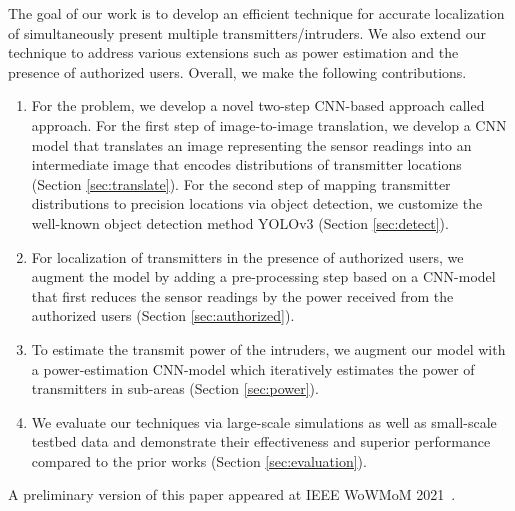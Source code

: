   The goal of our work is to develop an
efficient technique for accurate localization of simultaneously
present multiple transmitters/intruders. We also extend our technique to address various
extensions such as power estimation and the presence of authorized users. Overall, we make the following 
contributions.
\begin{enumerate}
\item
For the \mtl problem, we develop a novel two-step CNN-based approach called \our approach. 
For the first step of image-to-image translation, we develop a CNN model that translates an image representing the sensor readings into an intermediate image that encodes distributions of transmitter locations (Section \ref{sec:translate}). 
For the second step of mapping transmitter distributions to precision locations via object detection,
we customize the well-known  object detection method YOLOv3 (Section \ref{sec:detect}).

\item
For localization of transmitters in the presence of authorized users, we 
augment the \our model by adding a pre-processing step based on a 
CNN-model that first reduces the 
sensor readings by the power received from the authorized users (Section \ref{sec:authorized}).

\item
To estimate the transmit power of the intruders, we augment our \our model
with a power-estimation CNN-model which iteratively estimates the power of transmitters
in sub-areas (Section \ref{sec:power}).

\item
We evaluate our techniques via large-scale simulations as well as small-scale testbed data and demonstrate their effectiveness and superior
performance compared to the prior works (Section \ref{sec:evaluation}).
\end{enumerate}

A preliminary version of this paper appeared at IEEE WoWMoM 2021~\cite{wowmom21}.






